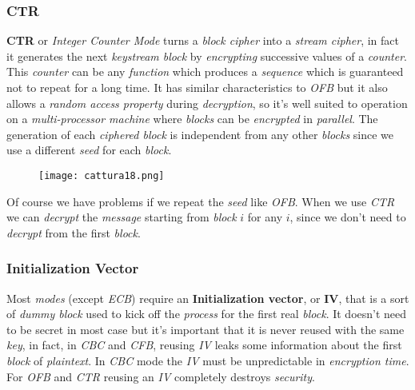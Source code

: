 \documentclass{article}
\begin{document}
\subsubsection{CTR}
\textbf{CTR} or \emph{Integer Counter Mode} turns a \emph{block cipher} into a \emph{stream cipher}, in fact it generates the next \emph{keystream block} by \emph{encrypting} successive values of a \emph{counter}. This \emph{counter} can be any \emph{function} which produces a \emph{sequence} which is guaranteed not to repeat for a long time. It has similar characteristics to \emph{OFB} but it also allows a \emph{random access property} during \emph{decryption}, so it's well suited to operation on a \emph{multi-processor machine} where \emph{blocks} can be \emph{encrypted} in \emph{parallel}. The generation of each \emph{ciphered block} is independent from any other \emph{blocks} since we use a different \emph{seed} for each \emph{block}. 
\begin{figure}[H]
  \centering
  \texttt{[image: cattura18.png]}
\end{figure}
Of course we have problems if we repeat the \emph{seed} like \emph{OFB}. When we use \emph{CTR} we can \emph{decrypt} the \emph{message} starting from \emph{block} $i$ for any $i$, since we don't need to \emph{decrypt} from the first \emph{block}. 
\subsubsection{Initialization Vector}
Most \emph{modes} (except \emph{ECB}) require an \textbf{Initialization vector}, or \textbf{IV}, that is a sort of \emph{dummy block} used to kick off the \emph{process} for the first real \emph{block}. It doesn't need to be secret in most case but it's important that it is never reused with the same \emph{key}, in fact, in \emph{CBC} and \emph{CFB}, reusing \emph{IV} leaks some information about the first \emph{block} of \emph{plaintext}. In \emph{CBC} mode the \emph{IV} must be unpredictable in \emph{encryption time}. For \emph{OFB} and \emph{CTR} reusing an \emph{IV} completely destroys \emph{security}. 
\end{document}
